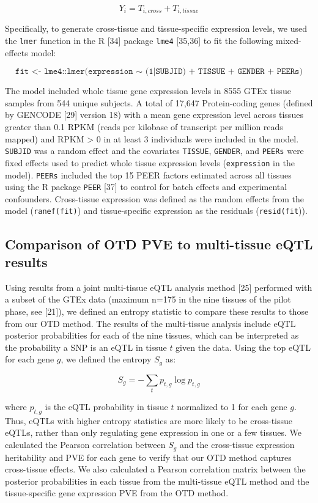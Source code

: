 \documentclass[10pt,letterpaper]{article}
\begin{document}
\[ Y_i = T_{i,cross} + T_{i,tissue} \]

Specifically, to generate cross-tissue and tissue-specific expression
levels, we used the \texttt{lmer} function in the R {[}34{]} package
\texttt{lme4} {[}35,36{]} to fit the following mixed-effects model:

\[ \texttt{fit <- lme4::lmer(expression $\sim$ (1|SUBJID) + TISSUE + GENDER + PEERs)} \]

The model included whole tissue gene expression levels in 8555 GTEx
tissue samples from 544 unique subjects. A total of 17,647
Protein-coding genes (defined by GENCODE {[}29{]} version 18) with a
mean gene expression level across tissues greater than 0.1 RPKM (reads
per kilobase of transcript per million reads mapped) and RPKM > 0 in at least 3 individuals were included in
the model. \texttt{SUBJID} was a random effect and the covariates
\texttt{TISSUE}, \texttt{GENDER}, and \texttt{PEERs} were fixed effects
used to predict whole tissue expression levels (\texttt{expression} in
the model). \texttt{PEERs} included the top 15 PEER factors estimated
across all tissues using the R package \texttt{PEER} {[}37{]} to control
for batch effects and experimental confounders. Cross-tissue expression
was defined as the random effects from the model (\texttt{ranef(fit)})
and tissue-specific expression as the residuals (\texttt{resid(fit})).

\subsection*{Comparison of OTD PVE to multi-tissue eQTL
results}\label{comparison-of-otd-pve-to-multi-tissue-eqtl-results}

Using results from a joint multi-tissue eQTL analysis method {[}25{]}
performed with a subset of the GTEx data (maximum n=175 in the nine
tissues of the pilot phase, see {[}21{]}), we defined an entropy
statistic to compare these results to those from our OTD method. The
results of the multi-tissue analysis include eQTL posterior
probabilities for each of the nine tissues, which can be interpreted as
the probability a SNP is an eQTL in tissue \(t\) given the data. Using
the top eQTL for each gene \(g\), we defined the entropy \(S_g\) as:

\[ S_g = -\sum_{t}p_{t,g} \log p_{t,g} \]

where \(p_{t,g}\) is the eQTL probability in tissue \(t\) normalized to
1 for each gene \(g\). Thus, eQTLs with higher entropy statistics are
more likely to be cross-tissue eQTLs, rather than only regulating gene
expression in one or a few tissues. We calculated the Pearson
correlation between \(S_g\) and the cross-tissue expression heritability
and PVE for each gene to verify that our OTD method captures
cross-tissue effects. We also calculated a Pearson correlation matrix
between the posterior probabilities in each tissue from the multi-tissue
eQTL method and the tissue-specific gene expression PVE from the OTD
method.
\end{document}
